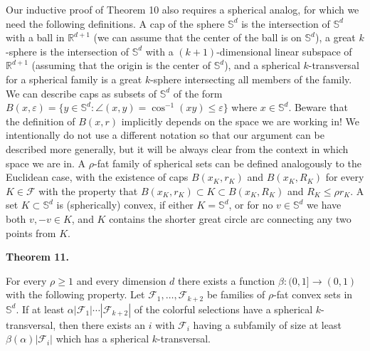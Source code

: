 \documentclass[10pt,a4paper]{amsart}
\begin{document}
Our inductive proof of Theorem 10 also requires a spherical analog, for which we need the following definitions. A cap of the sphere $\mathbb{S}^{d}$ is the intersection of $\mathbb{S}^{d}$ with a ball in $\mathbb{R}^{d+1}$ (we can assume that the center of the ball is on $\mathbb{S}^{d}$), a great $k$-sphere is the intersection of $\mathbb{S}^{d}$ with a $(k+1)$-dimensional linear subspace of $\mathbb{R}^{d+1}$ (assuming that the origin is the center of $\mathbb{S}^{d}$), and a spherical $k$-transversal for a spherical family is a great $k$-sphere intersecting all members of the family. We can describe caps as subsets of $\mathbb{S}^{d}$ of the form $B(x,\varepsilon)=\{y\in\mathbb{S}^{d}:\angle(x,y)=\cos^{-1}(xy)\leq\varepsilon\}$ where $x\in\mathbb{S}^{d}$. Beware that the definition of $B(x,r)$ implicitly depends on the space we are working in! We intentionally do not use a different notation so that our argument can be described more generally, but it will be always clear from the context in which space we are in. A $\rho$-fat family of spherical sets can be defined analogously to the Euclidean case, with the existence of caps $B(x_{K},r_{K})$ and $B(x_{K},R_{K})$ for every $K\in\mathcal{F}$ with the property that $B(x_{K},r_{K})\subset K\subset B(x_{K},R_{K})$ and $R_{K}\leq\rho r_{K}$. A set $K\subset\mathbb{S}^{d}$ is (spherically) convex, if either $K=\mathbb{S}^{d}$, or for no $v\in\mathbb{S}^{d}$ we have both $v,-v\in K$, and $K$ contains the shorter great circle arc connecting any two points from $K$.
\par
\par

\par\medskip\noindent\textbf{Theorem 11.}\par
For every $\rho\geq 1$ and every dimension $d$ there exists a function $\beta:(0,1]\to(0,1)$ with the following property. Let $\mathcal{F}_{1},\ldots,\mathcal{F}_{k+2}$ be families of $\rho$-fat convex sets in $\mathbb{S}^{d}$. If at least $\alpha|\mathcal{F}_{1}|\cdots|\mathcal{F}_{k+2}|$ of the colorful selections have a spherical $k$-transversal, then there exists an $i$ with $\mathcal{F}_{i}$ having a subfamily of size at least $\beta(\alpha)|\mathcal{F}_{i}|$ which has a spherical $k$-transversal.
\par
\par
\par
\end{document}
